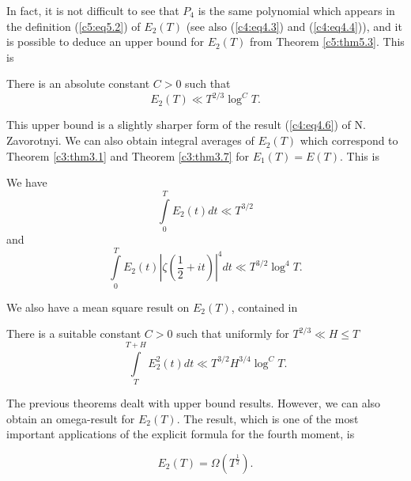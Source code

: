  In fact, it is not difficult to see that $P_4$ is the same polynomial which appears in the definition (\ref{c5:eq5.2}) of $E_2(T)$ (see also (\ref{c4:eq4.3}) and (\ref{c4:eq4.4})), and it is possible to deduce an upper bound for $E_2(T)$ from Theorem \ref{c5:thm5.3}. This is 

 \begin{thm}\label{c5:thm5.4}
 There is an absolute constant $C>0$ such that 
 \begin{equation}
 E_2(T) \ll T^{2/3} \log^C T. \label{c5:eq5.15}
 \end{equation}
 \end{thm}

 This upper bound is a slightly sharper form of the result
 (\ref{c4:eq4.6}) of N. Zavorotnyi. We can also obtain integral
 averages of $E_2(T)$ which correspond to Theorem \ref{c3:thm3.1} and
 Theorem \ref{c3:thm3.7} for $E_1(T) = E(T)$. This is 

\begin{thm}\label{c5:thm5.5}
We have
\begin{equation}
\int\limits^T_0 E_2(t) dt \ll T^{3/2}\label{c5:eq5.16}
\end{equation}
and
\begin{equation}
\int\limits^T_0 E_2(t) \left|\zeta \left(\frac{1}{2} + it
\right)\right|^4 dt \ll T^{3/2} \log^4 T.\label{c5:eq5.17} 
\end{equation}

We also have a mean square result on $E_2(T)$, contained in 
\end{thm}

\begin{thm}\label{c5:thm5.6}
There is a suitable constant $C>0$ such that uniformly for $T^{2/3}
\ll H \leq T$ 
\begin{equation}
\int\limits^{T+H}_T E^2_2(t) dt \ll T^{3/2} H^{3/4} \log^C
T.\label{c5:eq5.18} 
\end{equation}\pageoriginale
\end{thm}

The previous theorems dealt with upper bound results. However, we can also obtain an omega-result for $E_2(T)$. The result, which is one of the most important applications of the explicit formula for the fourth moment, is 

\begin{thm}\label{c5:thm5.7}
\begin{equation}
E_2(T) = \Omega (T^{\frac{1}{2}}). \label{c5:eq5.19}
\end{equation}
\end{thm}

